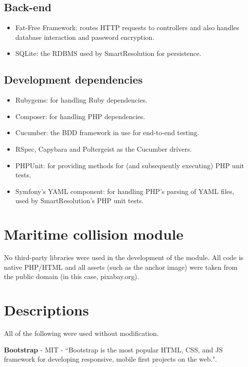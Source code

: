 \subsection{Back-end}

\begin{itemize}
\item Fat-Free Framework: routes HTTP requests to controllers and also handles database interaction and password encryption.
\item SQLite: the RDBMS used by SmartResolution for persistence.
\end{itemize}

\subsection{Development dependencies}

\begin{itemize}
\item Rubygems: for handling Ruby dependencies.
\item Composer: for handling PHP dependencies.
\item Cucumber: the BDD framework in use for end-to-end testing.
\item RSpec, Capybara and Poltergeist as the Cucumber drivers.
\item PHPUnit: for providing methods for (and subsequently executing) PHP unit tests.
\item Symfony's YAML component: for handling PHP's parsing of YAML files, used by SmartResolution's PHP unit tests.
\end{itemize}

\section{Maritime collision module}

No third-party libraries were used in the development of the module. All code is native PHP/HTML and all assets (such as the anchor image) were taken from the public domain (in this case, pixabay.org).

\section{Descriptions}

All of the following were used without modification.

\textbf{Bootstrap} - MIT - ``Bootstrap is the most popular HTML, CSS, and JS framework for developing responsive, mobile first projects on the web.".


